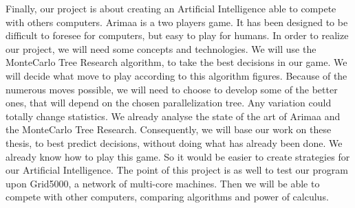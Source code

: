 
Finally, our project is about creating an Artificial Intelligence able to compete with others computers.
\newline
\newline
Arimaa is a two players game. It has been designed to be difficult to foresee for computers, but easy to play for humans. 
In order to realize our project, we will need some concepts and technologies. 
We will use the MonteCarlo Tree Research algorithm, to take the best decisions in our game. We will decide what move to play according to this algorithm figures. Because of the numerous moves possible, we will need to choose to develop some of the better ones, that will depend on the chosen parallelization tree. Any variation could totally change statistics.
We already analyse the state of the art of Arimaa and the MonteCarlo Tree Research. Consequently, we will base our work on these thesis, to best predict decisions, without doing what has already been done.
We already know how to play this game. So it would be easier to create strategies for our Artificial Intelligence. 
\newline
\newline
The point of this project is as well to test our program upon Grid5000, a network of multi-core machines. Then we will be able to compete with other computers, comparing algorithms and power of calculus.
